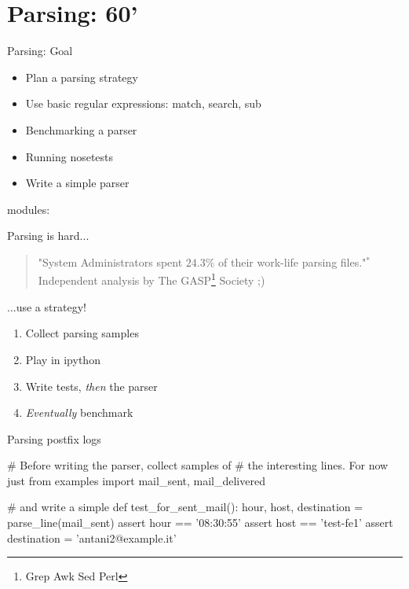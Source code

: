 \section{Parsing: 60'}

\begin{pyframe}{Parsing: Goal}
\begin{itemize}
\item Plan a parsing strategy
\item Use basic regular expressions: match, search, sub
\item Benchmarking a parser
\item Running nosetests
\item Write a simple parser
\end{itemize}
modules: 
\end{pyframe}


\begin{pyframe}{Parsing is hard...}
\begin{verse}
"System Administrators spent $24.3\%$ of
 their work-life parsing files."$^{*}$\\
\hfill *Independent analysis by The GASP\footnote{Grep Awk Sed Perl} Society ;)
\end{verse}
\end{pyframe}


\begin{pyframe}{...use a strategy!}
\begin{enumerate}
\Large
\item Collect parsing samples
\item Play in ipython
\item Write tests, \emph{then} the parser
\item \emph{Eventually} benchmark
\end{enumerate}
\end{pyframe}



\begin{pyframe}{Parsing postfix logs}
\begin{pythoncode}
# Before writing the parser, collect samples of
#  the interesting lines. For now just 
from examples import mail_sent, mail_delivered

# and write a simple 
def test_for_sent_mail():
    hour, host, destination = parse_line(mail_sent)
    assert hour == '08:30:55'
    assert host == 'test-fe1'
    assert destination = 'antani2@example.it'

\end{pythoncode}
\end{pyframe}


